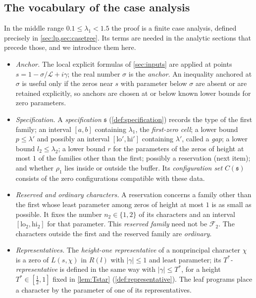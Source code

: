 \documentclass[11pt]{amsart}
\numberwithin{equation}{section}
\theoremstyle{plain}
\theoremstyle{definition}
\theoremstyle{remark}
\newcommand{\LL}{\mathcal{L}}
\newcommand{\lo}{\mathrm{lo}}
\newcommand{\hi}{\mathrm{hi}}
\newcommand{\1}{\mathbf{1}}
\begin{document}
\subsection{The vocabulary of the case analysis}\label{subsec:vocabulary}
In the middle range $0.1\le\lambda_1<1.5$ the proof is a finite case analysis, defined
precisely in \cref{sec:lp,sec:casetree}. Its terms are needed in the analytic sections that
precede those, and we introduce them here.
\begin{itemize}
  \item \emph{Anchor.} The local explicit formulas of \cref{sec:inputs} are applied at points
    $s=1-\sigma/\LL+i\gamma$; the real number $\sigma$ is the \emph{anchor}. An inequality anchored
    at $\sigma$ is useful only if the zeros near $s$ with parameter below $\sigma$ are absent or are
    retained explicitly, so anchors are chosen at or below known lower bounds for zero parameters.
  \item \emph{Specification.} A \emph{specification} $\mathfrak s$ (\cref{def:specification})
    records the type of the first family; an interval $[a,b]$ containing $\lambda_1$, the
    \emph{first-zero cell}; a lower bound $p\le\lambda'$ and possibly an interval
    $[\lo',\hi']$ containing $\lambda'$, called a \emph{gap}; a lower bound $l_2\le\lambda_2$; a
    lower bound $r$ for the parameters of the zeros of height at most $1$ of the families other
    than the first; possibly a reservation (next item); and whether $\rho_1$ lies inside or
    outside the buffer. Its \emph{configuration set} $C(\mathfrak s)$ consists of the zero
    configurations compatible with these data.
  \item \emph{Reserved and ordinary characters.} A reservation concerns a family other than the
    first whose least parameter among zeros of height at most $1$ is as small as possible. It
    fixes the number $n_2\in\{1,2\}$ of its characters and an interval $[\lo_2,\hi_2]$ for that
    parameter. This \emph{reserved family} need not be $\mathcal F_2$. The characters outside the
    first and the reserved family are \emph{ordinary}.
  \item \emph{Representatives.} The \emph{height-one representative} of a nonprincipal character
    $\chi$ is a zero of $L(s,\chi)$ in $R(l)$ with $|\gamma|\le1$ and least parameter; its
    \emph{$T^*$-representative} is defined in the same way with $|\gamma|\le T^*$, for a height
    $T^*\in[\frac12,1]$ fixed in \cref{lem:Tstar} (\cref{def:representative}). The leaf programs
    place a character by the parameter of one of its representatives.

\end{itemize}
\end{document}
